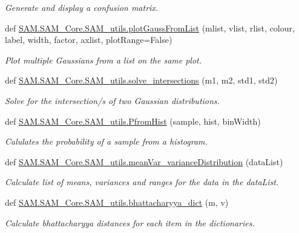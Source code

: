 \begin{DoxyCompactItemize}
\begin{DoxyCompactList}\small\item\em Generate and display a confusion matrix. \end{DoxyCompactList}\item 
def \hyperlink{group__icubclient__SAM__utils_gaf5214036730562004563e7c122e65998}{S\+A\+M.\+S\+A\+M\+\_\+\+Core.\+S\+A\+M\+\_\+utils.\+plot\+Gauss\+From\+List} (mlist, vlist, rlist, colour, label, width, factor, axlist, plot\+Range=False)
\begin{DoxyCompactList}\small\item\em Plot multiple Gaussians from a list on the same plot. \end{DoxyCompactList}\item 
def \hyperlink{group__icubclient__SAM__utils_gab49784000971804130fa10c1e3ad817d}{S\+A\+M.\+S\+A\+M\+\_\+\+Core.\+S\+A\+M\+\_\+utils.\+solve\+\_\+intersections} (m1, m2, std1, std2)
\begin{DoxyCompactList}\small\item\em Solve for the intersection/s of two Gaussian distributions. \end{DoxyCompactList}\item 
def \hyperlink{group__icubclient__SAM__utils_ga36c10c3281fd9c5aa4aeacacc693ee71}{S\+A\+M.\+S\+A\+M\+\_\+\+Core.\+S\+A\+M\+\_\+utils.\+Pfrom\+Hist} (sample, hist, bin\+Width)
\begin{DoxyCompactList}\small\item\em Calulates the probability of a sample from a histogram. \end{DoxyCompactList}\item 
def \hyperlink{group__icubclient__SAM__utils_ga82624221423212408df437771ccbd026}{S\+A\+M.\+S\+A\+M\+\_\+\+Core.\+S\+A\+M\+\_\+utils.\+mean\+Var\+\_\+variance\+Distribution} (data\+List)
\begin{DoxyCompactList}\small\item\em Calculate list of means, variances and ranges for the data in the data\+List. \end{DoxyCompactList}\item 
def \hyperlink{group__icubclient__SAM__utils_ga9f9e9fc5c10660319b4d78dcb1a04d10}{S\+A\+M.\+S\+A\+M\+\_\+\+Core.\+S\+A\+M\+\_\+utils.\+bhattacharyya\+\_\+dict} (m, v)
\begin{DoxyCompactList}\small\item\em Calculate bhattacharyya distances for each item in the dictionaries. \end{DoxyCompactList}\item 

\end{DoxyCompactItemize}
